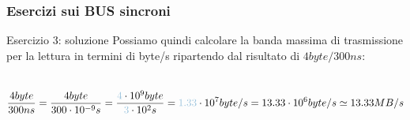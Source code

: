 \begin{frame}
	\frametitle{Esercizi sui BUS sincroni}
	
	\begin{block}{Esercizio 3: soluzione}
		Possiamo quindi calcolare la banda massima di trasmissione per la lettura in termini di byte/s ripartendo dal risultato di $4byte/300ns$:\\~\\
		
		\begin{scriptsize}
		$$\frac{4byte}{300ns} = \frac{4byte}{300 \cdot 10^{-9} s} = \frac{{\color{CpuBlue}4} \cdot 10^{9}byte}{{\color{CpuBlue}3} \cdot 10^{2}s}= {\color{CpuBlue}1.33} \cdot 10^{7} byte/s = 13.33 \cdot 10^{6} byte/s \simeq 13.33 MB/s$$
		\end{scriptsize}
		
	\end{block}
\end{frame}


%
%	


